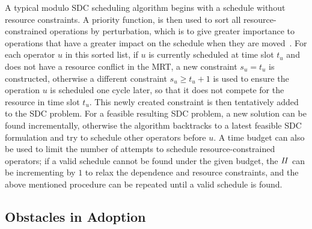 A typical modulo SDC scheduling algorithm begins with a schedule without
resource constraints.  A priority function, is then used to sort all
resource-constrained operations by perturbation, which is to give greater
importance to operations that have a greater impact on the schedule when they
are moved~\cite{canis14}.  For each operator $u$ in this sorted list, if $u$ is
currently scheduled at time slot $t_u$ and does not have a resource conflict
in the MRT, a new constraint $s_u = t_u$ is constructed, otherwise a different
constraint $s_u \geq t_u + 1$ is used to ensure the operation $u$ is scheduled
one cycle later, so that it does not compete for the resource in time slot
$t_u$.  This newly created constraint is then tentatively added to the SDC
problem.  For a feasible resulting SDC problem, a new solution can be found
incrementally, otherwise the algorithm backtracks to a latest feasible SDC
formulation and try to schedule other operators before $u$.  A time budget can
also be used to limit the number of attempts to schedule resource-constrained
operators; if a valid schedule cannot be found under the given budget,
the $\mathit{II}$ can be incrementing by $1$ to relax the dependence and resource
constraints, and the above mentioned procedure can be repeated until a valid
schedule is found.


\subsection{Obstacles in Adoption}
\label{sub:obstacles_in_adoption}



